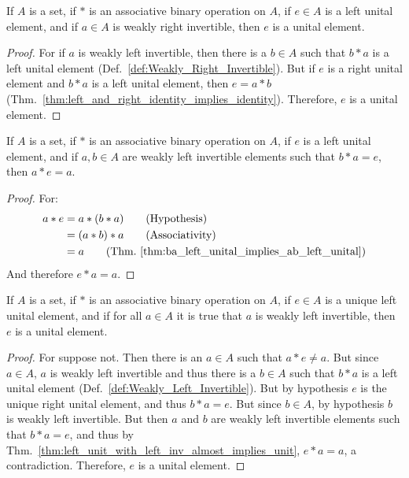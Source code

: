     \begin{theorem}
        If $A$ is a set, if $*$ is an associative binary operation on $A$, if
        $e\in{A}$ is a left unital element, and if $a\in{A}$ is weakly right
        invertible, then $e$ is a unital element.
    \end{theorem}
    \begin{proof}
        For if $a$ is weakly left invertible, then there is a $b\in{A}$ such
        that $b*a$ is a left unital element
        (Def.~\ref{def:Weakly_Right_Invertible}). But if $e$ is a right unital
        element and $b*a$ is a left unital element, then $e=a*b$
        (Thm.~\ref{thm:left_and_right_identity_implies_identity}). Therefore,
        $e$ is a unital element.
    \end{proof}
    \begin{theorem}
        \label{thm:left_unit_with_left_inv_almost_implies_unit}%
        If $A$ is a set, if $*$ is an associative binary operation on $A$, if
        $e$ is a left unital element, and if $a,b\in{A}$ are weakly left
        invertible elements such that $b*a=e$, then $a*e=a$.
    \end{theorem}
    \begin{proof}
        For:
        \begin{align}
            a*e&=a*(b*a)
            \tag{Hypothesis}\\
            &=(a*b)*a
            \tag{Associativity}\\
            &=a
            \tag{Thm.~\ref{thm:ba_left_unital_implies_ab_left_unital}}
        \end{align}
        And therefore $e*a=a$.
    \end{proof}
    \begin{theorem}
        \label{thm:left_unit_with_left_inv_implies_unit}%
        If $A$ is a set, if $*$ is an associative binary operation on $A$, if
        $e\in{A}$ is a unique left unital element, and if for all $a\in{A}$ it
        is true that $a$ is weakly left invertible, then $e$ is a unital
        element.
    \end{theorem}
    \begin{proof}
        For suppose not. Then there is an $a\in{A}$ such that $a*e\ne{a}$. But
        since $a\in{A}$, $a$ is weakly left invertible and thus there is a
        $b\in{A}$ such that $b*a$ is a left unital element
        (Def.~\ref{def:Weakly_Left_Invertible}). But by hypothesis $e$ is the
        unique right unital element, and thus $b*a=e$. But since $b\in{A}$,
        by hypothesis $b$ is weakly left invertible. But then $a$ and $b$ are
        weakly left invertible elements such that $b*a=e$, and thus by
        Thm.~\ref{thm:left_unit_with_left_inv_almost_implies_unit}, $e*a=a$,
        a contradiction. Therefore, $e$ is a unital element.
    \end{proof}
